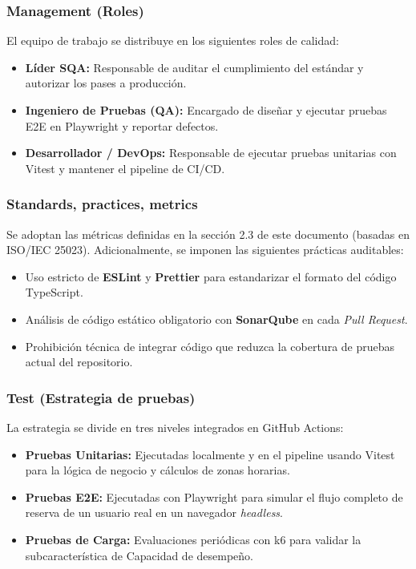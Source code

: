\documentclass[12pt, a4paper]{article}
\begin{document}
\subsubsection*{Management (Roles)}
El equipo de trabajo se distribuye en los siguientes roles de calidad:
\begin{itemize}
    \item \textbf{Líder SQA:} Responsable de auditar el cumplimiento del estándar y autorizar los pases a producción.
    \item \textbf{Ingeniero de Pruebas (QA):} Encargado de diseñar y ejecutar pruebas E2E en Playwright y reportar defectos.
    \item \textbf{Desarrollador / DevOps:} Responsable de ejecutar pruebas unitarias con Vitest y mantener el pipeline de CI/CD.
\end{itemize}

\subsubsection*{Standards, practices, metrics}
Se adoptan las métricas definidas en la sección 2.3 de este documento (basadas en ISO/IEC 25023). Adicionalmente, se imponen las siguientes prácticas auditables:
\begin{itemize}
    \item Uso estricto de \textbf{ESLint} y \textbf{Prettier} para estandarizar el formato del código TypeScript.
    \item Análisis de código estático obligatorio con \textbf{SonarQube} en cada \textit{Pull Request}.
    \item Prohibición técnica de integrar código que reduzca la cobertura de pruebas actual del repositorio.
\end{itemize}

\subsubsection*{Test (Estrategia de pruebas)}
La estrategia se divide en tres niveles integrados en GitHub Actions:
\begin{itemize}
    \item \textbf{Pruebas Unitarias:} Ejecutadas localmente y en el pipeline usando Vitest para la lógica de negocio y cálculos de zonas horarias.
    \item \textbf{Pruebas E2E:} Ejecutadas con Playwright para simular el flujo completo de reserva de un usuario real en un navegador \textit{headless}.
    \item \textbf{Pruebas de Carga:} Evaluaciones periódicas con k6 para validar la subcaracterística de Capacidad de desempeño.
\end{itemize}
\end{document}
